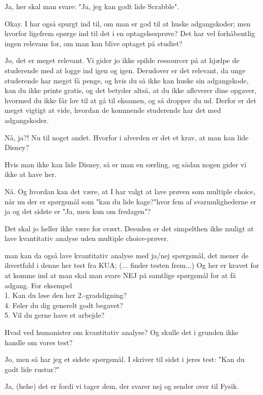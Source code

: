\documentclass[a4paper,11pt]{article}
\begin{document}
\begin{sketch}
 Ja, her skal man svare: "Ja, jeg kan godt lide Scrabble".

 Okay. I har også spurgt ind til, om man er god til at huske adgangskoder; men hvorfor ligefrem spørge ind til det i en optagelsesprøve? Det har vel forhåbentlig ingen relevans for, om man kan blive optaget på studiet?

 Jo, det er meget relevant. Vi gider jo ikke spilde ressourcer på at hjælpe de studerende med at logge ind igen og igen. Derudover er det relevant, da unge studerende har meget få penge, og hvis du så ikke kan huske sin adgangskode, kan du ikke printe gratis, og det betyder altså, at du ikke afleverer dine opgaver, hvormed du ikke får lov til at gå til eksamen, og så dropper du ud. Derfor er det meget vigtigt at vide, hvordan de kommende studerende har det med adgangskoder.

 Nå, ja?! Nu til noget andet. Hvorfor i alverden er det et krav, at man kan lide Disney?

 Hvis man ikke kan lide Disney, så er man en særling, og sådan nogen gider vi ikke at have her.

 Nå. Og hvordan kan det være, at I har valgt at lave prøven som multiple choice, når nu der er spørgsmål som "kan du lide kage?"hvor fem af svarmulighederne er ja og det sidste er "Ja, men kun om fredagen"?

 Det skal jo heller ikke være for svært. Desuden er det simpelthen ikke muligt at lave kvantitativ analyse uden multiple choice-prøver.

 man kan da også lave kvantitativ analyse med ja/nej spørgsmål, det mener de ihvertfald i denne her test fra KUA; (... finder testen frem...) Og her er kravet for at komme ind at man skal man svare NEJ på samtlige spørgsmål for at få adgang. For eksempel \\

1. Kan du løse den her 2.-gradsligning? \\
4. Føler du dig generelt godt begavet? \\
5. Vil du gerne have et arbejde?

 Hvad ved humanister om kvantitativ analyse? Og skulle det i grunden ikke handle om vores test?

 Jo, men så har jeg et sidste spørgsmål. I skriver til sidst i jeres test: "Kan du godt lide rustur?"

 Ja, (hehe) det er fordi vi tager dem, der svarer nej og sender over til Fysik.

\end{sketch}
\end{document}
